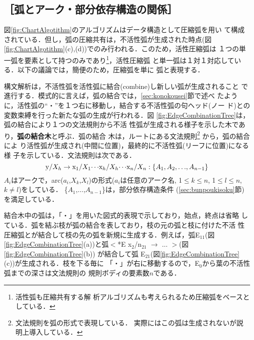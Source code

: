\subsection*{［弧とアーク・部分依存構造の関係］}

図\ref{fig:ChartAlgotithm}のアルゴリズムはデータ構造として圧縮弧を用い
て構成されている．但し，弧の圧縮共有は，不活性弧が生成された時点(図
\ref{fig:ChartAlgotithm}(c),(d))でのみ行われる．このため，活性圧縮弧は
１つの単一弧を要素として持つのみであり\footnote{活性弧も圧縮共有する解
析アルゴリズムも考えられるため圧縮弧をベースとしている．}，活性圧縮弧
と単一弧は１対１対応している．以下の議論では，簡便のため，圧縮弧を単に
弧と表現する．


構文解析は，不活性弧を活性弧に結合(combine)し新しい弧が生成されること
で進行する．模式的に言えば，弧の結合では，\ref{sec:konokousei}節で述べ
たように，活性弧の``・''を１つ右に移動し，結合する不活性弧の句ヘッド(ノー
ド)との変数束縛を行った新たな弧の生成が行われる．図
\ref{fig:EdgeCombinationTree}は，弧の結合により１つの文法規則から不活
性弧が生成される様子を示した木であり，{\bf 弧の結合木}と呼ぶ．弧の結合
木は，ルートにある文法規則\footnote{文法規則を弧の形式で表現している．
実際にはこの弧は生成されないが説明上導入している．} から，弧の結合によ
り活性弧が生成され(中間に位置)，最終的に不活性弧(リーフに位置)になる様
子を示している．文法規則は次である．
$${\rm y/}X_h \rightarrow {\rm x}_1{\rm /}X_1 {\cdots} {\rm x}_h{\rm
/}X_h {\cdots} {\rm x}_n{\rm /}X_n : \{A_1,A_2,{\ldots},A_{n-1}\}$$
$A_i$はアークで，arc($a_i$,$X_k$,$X_l$)の形式($a_i$は任意のアーク名,
1${\leq}k{\leq}n$, 1${\leq}l{\leq}n$, $k{\neq}l$)をしている．
\{$A_1$,${\ldots}$,$A_{n-1}$\}は，部分依存構造条件
(\ref{sec:bunpoukisoku}節)を満足している．

結合木中の弧は，「・」を用いた図式的表現で示しており，始点，終点は省略
している．弧を結ぶ枝が弧の結合を表しており，枝の元の弧と枝に付けた不活
性圧縮弧とが結合して枝の先の弧を新規に生成する．例えば，弧E$_{11}$(図
\ref{fig:EdgeCombinationTree}(a))と弧$<$*E x$_2$/n$_{21}$
$\rightarrow$ ${\ldots}$ $>$(図\ref{fig:EdgeCombinationTree}(b)) が結合して弧
E$_{21}$(図\ref{fig:EdgeCombinationTree}(c))が生成される．枝を下る毎に
「・」が右に移動するので，E$_0$から葉の不活性弧までの深さは文法規則の
規則ボディの要素数$n$である．

